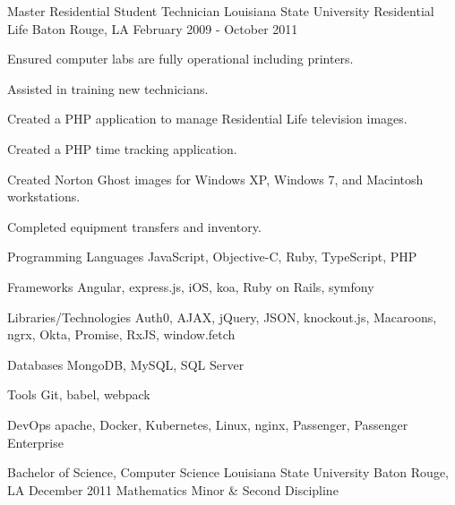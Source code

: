 \documentclass[letterpaper]{awesome-cv}
\begin{document}
\begin{cventries}
  \cventry
    {Master Residential Student Technician}
    {Louisiana State University Residential Life}
    {Baton Rouge, LA}
    {February 2009 - October 2011}
    {\begin{cvitems}
      \item {Ensured computer labs are fully operational including printers.}
      \item {Assisted in training new technicians.}
      \item {Created a PHP application to manage Residential Life television images.}
      \item {Created a PHP time tracking application.}
      \item {Created Norton Ghost images for Windows XP, Windows 7, and Macintosh workstations.}
      \item {Completed equipment transfers and inventory.}
      \end{cvitems}}
\end{cventries}

\begin{cvskills}
	\cvskill
    {Programming Languages}
    {JavaScript, Objective-C, Ruby, TypeScript, PHP}

  \cvskill
    {Frameworks}
    {Angular, express.js, iOS, koa, Ruby on Rails, symfony}

  \cvskill
    {Libraries/Technologies}
    {Auth0, AJAX, jQuery, JSON, knockout.js, Macaroons, ngrx, Okta, Promise, RxJS, window.fetch}

  \cvskill
    {Databases}
    {MongoDB, MySQL, SQL Server}

  \cvskill
    {Tools}
    {Git, babel, webpack}

  \cvskill
    {DevOps}
    {apache, Docker, Kubernetes, Linux, nginx, Passenger, Passenger Enterprise}
\end{cvskills}

\begin{cventries}
	\cventry
    {Bachelor of Science, Computer Science}
    {Louisiana State University}
    {Baton Rouge, LA}
    {December 2011}
    {Mathematics Minor \& Second Discipline}
\end{cventries}
\end{document}
